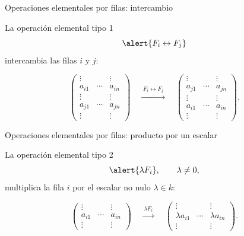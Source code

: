 \begin{frame}{Operaciones elementales por filas: intercambio}

La \alert{operación elemental tipo 1}
\[
\alert{F_i\leftrightarrow F_j}
\]
intercambia las filas \(i\) y \(j\):

\medskip

\[
\begin{pmatrix}
\vdots&&\vdots\\
a_{i1} & \cdots & a_{in}\\
\vdots &&\vdots\\
a_{j1} & \cdots & a_{jn}\\
\vdots &&\vdots
\end{pmatrix}
\quad
\xrightarrow{\;F_i\leftrightarrow F_j\;}
\quad
\begin{pmatrix}
\vdots &&\vdots\\
a_{j1} & \cdots & a_{jn}\\
\vdots &&\vdots\\
a_{i1} & \cdots & a_{in}\\
\vdots &&\vdots
\end{pmatrix}.
\]

\end{frame}


\begin{frame}{Operaciones elementales por filas: producto por un escalar}

La \alert{operación elemental tipo 2}
\[
\alert{\lambda F_i},
\qquad \lambda\neq0,
\]
multiplica la fila \(i\) por el escalar no nulo \(\lambda\in k\):

\medskip

\[
\begin{pmatrix}
\vdots &&\vdots\\
a_{i1} & \cdots & a_{in}\\
\vdots &&\vdots
\end{pmatrix}
\quad
\xrightarrow{\;\lambda F_i\;}
\quad
\begin{pmatrix}
\vdots &&\vdots\\
\lambda a_{i1} & \cdots & \lambda a_{in}\\
\vdots &&\vdots
\end{pmatrix}.
\]

\end{frame}

